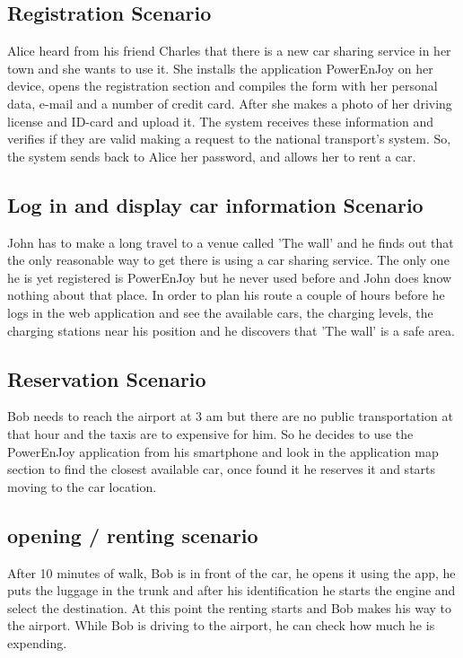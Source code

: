 \subsection {Registration Scenario}
Alice heard from his friend Charles that there is a new car sharing service in her town and she wants to use it. She installs the application PowerEnJoy on her device, opens the registration section and compiles the form with her personal data, e-mail and a number of credit card. After she makes a photo of her driving license and ID-card and upload it. The system receives these information and verifies if they are valid making a request to the national transport's system. So, the system sends back to Alice her password, and allows her to rent a car. 

\subsection{Log in and display car information Scenario}
John has to make a long travel to a venue called 'The wall' and he finds out that the only reasonable way to get there is using a car sharing service. The only one he is yet registered is PowerEnJoy but he never used before and John does know nothing about that place. In order to plan his route a couple of hours before he logs in the web application and see the available cars, the charging levels, the charging stations near his position and he discovers that 'The wall' is a safe area. 

\subsection{Reservation Scenario}
Bob needs to reach the airport at 3 am but there are no public transportation at that hour and the taxis are to expensive for him. So he decides to use the PowerEnJoy application from his smartphone and look in the application map section to find the closest available car, once found it he reserves it and starts moving to the car location. 

\subsection{opening / renting scenario}
After 10 minutes of walk, Bob is in front of the car, he opens it using the app, he puts the luggage in the trunk and after his identification he starts the engine and select the destination. At this point the renting starts and Bob makes his way to the airport. 
While Bob is driving to the airport, he can check how much he is expending.

